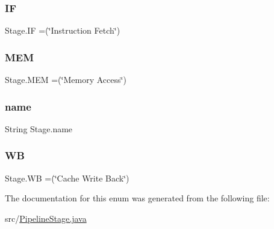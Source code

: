 \mbox{\label{enum_stage_aeffba6edad8f19fb7f9a4d8acf9c5a7b}} 
\subsubsection{\texorpdfstring{IF}{IF}}
{\footnotesize\ttfamily Stage.\+IF =(\char`\"{}Instruction Fetch\char`\"{})}

\mbox{\label{enum_stage_a9f5ca32ff09a37d81d80d1298350a57d}} 
\subsubsection{\texorpdfstring{M\+EM}{MEM}}
{\footnotesize\ttfamily Stage.\+M\+EM =(\char`\"{}Memory Access\char`\"{})}

\mbox{\label{enum_stage_af32f9e7d7f90f13fd25b01dccbc49cb0}} 
\subsubsection{\texorpdfstring{name}{name}}
{\footnotesize\ttfamily String Stage.\+name\hspace{0.3cm}{\ttfamily [private]}}

\mbox{\label{enum_stage_af6726871c185b151ca9747f844e71b9c}} 
\subsubsection{\texorpdfstring{WB}{WB}}
{\footnotesize\ttfamily Stage.\+WB =(\char`\"{}Cache Write Back\char`\"{})}



The documentation for this enum was generated from the following file\+:\begin{DoxyCompactItemize}
\item 
src/\mbox{\hyperlink{_pipeline_stage_8java}{Pipeline\+Stage.\+java}}\end{DoxyCompactItemize}
